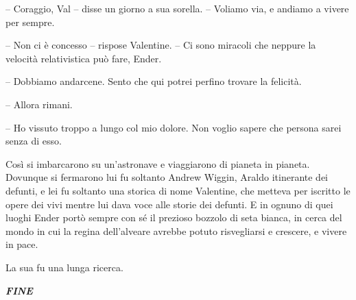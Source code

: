 {-- Coraggio, Val -- disse un giorno a sua sorella. -- Voliamo via, e
	andiamo a vivere per sempre.}

{-- Non ci è concesso -- rispose Valentine. -- Ci sono miracoli che
	neppure la velocità relativistica può fare, Ender.}

{-- Dobbiamo andarcene. Sento che qui potrei perfino trovare la
	felicità.}

{-- Allora rimani.}

{-- Ho vissuto troppo a lungo col mio dolore. Non voglio sapere che
	persona sarei senza di esso.}

{Così si imbarcarono su un'astronave e viaggiarono di pianeta in
	pianeta. Dovunque si fermarono lui fu soltanto Andrew Wiggin, Araldo
	itinerante dei defunti, e lei fu soltanto una storica di nome Valentine,
	che metteva per iscritto le opere dei vivi mentre lui dava voce alle
	storie dei defunti. E in ognuno di quei luoghi Ender portò sempre con sé
	il prezioso bozzolo di seta bianca, in cerca del mondo in cui la regina
	dell'alveare avrebbe potuto risvegliarsi e crescere, e vivere in pace.}

{La sua fu una lunga ricerca.}

\begin{center}
	\textbf{\emph{{FINE}}}
\end{center}

\newpage\blankpage